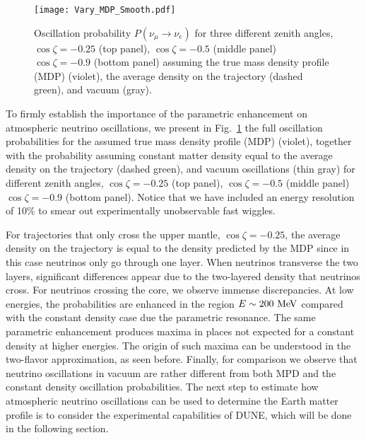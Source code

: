 \begin{figure}[t]
\begin{center}
\texttt{[image: Vary\_MDP\_Smooth.pdf]}
\caption{Oscillation probability $P(\nu_\mu \to \nu_e)$ for three different zenith angles, $\cos\zeta=-0.25$ (top panel),
$\cos\zeta=-0.5$ (middle panel) $\cos\zeta=-0.9$ (bottom panel) assuming the true mass density profile (MDP) (violet), the average density on the trajectory (dashed green), and vacuum (gray). \label{fig:Pmue_VaryMDP}}
\end{center}
\end{figure}
To firmly establish the importance of the parametric enhancement on atmospheric neutrino oscillations, we present in Fig.~\ref{fig:Pmue_VaryMDP} the full oscillation probabilities for the assumed true mass density profile (MDP) (violet), together with the probability assuming constant matter density equal to the average density on the trajectory (dashed green), and vacuum oscillations (thin gray) for different zenith angles, $\cos\zeta=-0.25$ (top panel), $\cos\zeta=-0.5$ (middle panel) $\cos\zeta=-0.9$ (bottom panel). 
Notice that we have included an energy resolution of 10\% to smear out experimentally unobservable fast wiggles.

For trajectories that only cross the upper mantle, $\cos\zeta=-0.25$, the average density on the trajectory is equal to the density predicted by the MDP since in this case neutrinos only go through one layer. 
When neutrinos transverse the two layers, significant differences appear due to the two-layered density that neutrinos cross. 
For neutrinos crossing the core, we observe immense discrepancies. 
At low energies, the probabilities are enhanced in the region $E\sim 200~{\rm MeV}$ compared with the constant density case due the parametric resonance. 
The same parametric enhancement produces maxima in places not expected for a constant density at higher energies. 
The origin of such maxima can be understood in the two-flavor approximation, as seen before. 
Finally, for comparison we observe that neutrino oscillations in vacuum are rather different from both  MPD and the constant density oscillation probabilities. 
The next step to estimate how atmospheric neutrino oscillations can be used to determine the Earth matter profile is to consider the experimental capabilities of DUNE, which will be done in the following section.







